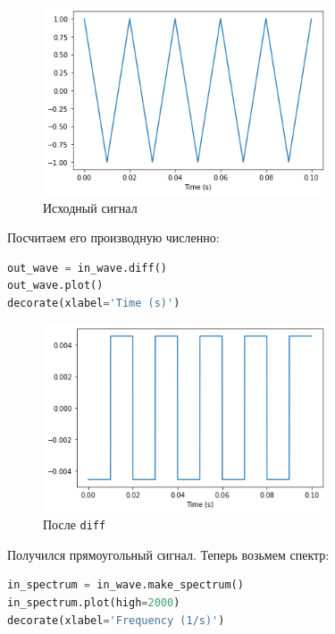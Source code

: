 \documentclass[a4paper,12pt]{report}
\begin{document}
    \begin{figure}[H]
        \centering
        \includegraphics[width=0.75\textwidth]{ex1_in_wave.png}
        \caption{Исходный сигнал}
        \label{fig:ex1_in_wave}
    \end{figure}

    Посчитаем его производную численно:
    
\begin{lstlisting}[language=Python,caption=Делаем \texttt{diff}]
out_wave = in_wave.diff()
out_wave.plot()
decorate(xlabel='Time (s)')
\end{lstlisting}

    \begin{figure}[H]
        \centering
        \includegraphics[width=0.75\textwidth]{ex1_out_wave.png}
        \caption{После \texttt{diff}}
        \label{fig:ex1_out_wave}
    \end{figure}

    Получился прямоугольный сигнал. Теперь возьмем спектр:
    
\begin{lstlisting}[language=Python,caption=Спектр]
in_spectrum = in_wave.make_spectrum()
in_spectrum.plot(high=2000)
decorate(xlabel='Frequency (1/s)')
\end{lstlisting}
\end{document}
